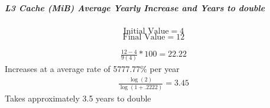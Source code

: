 \documentclass{article}
\begin{document}
    \subparagraph*{L3 Cache (MiB) Average Yearly Increase and Years to double}
    
    \[ \text{Initial Value} = 4 \]   
    \[ \text{Final Value} = 12 \]    

   \begin{align*}
        \frac{12-4}{9(4)} * 100 = 22.22%
    \end{align*}
    Increases at a average rate of 5777.77\% per year
    \begin{align*}
        \frac{\log(2)}{\log(1+.2222)} = 3.45
    \end{align*}
    Takes approximately 3.5 years to double

    


    
\end{document}

